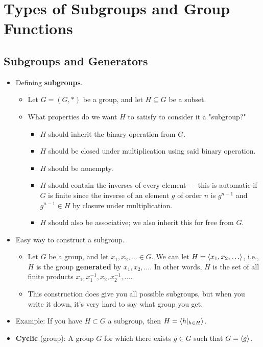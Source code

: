 \documentclass[../notes.tex]{subfiles}
\begin{document}
\chapter{Types of Subgroups and Group Functions}
\section{Subgroups and Generators}
\begin{itemize}
    \item {}Defining \textbf{subgroups}.
    \begin{itemize}
        \item Let $G=(G,*)$ be a group, and let $H\subseteq G$ be a subset.
        \item What properties do we want $H$ to satisfy to consider it a "subgroup?"
        \begin{itemize}
            \item $H$ should inherit the binary operation from $G$.
            \item $H$ should be closed under multiplication using said binary operation.
            \item $H$ should be nonempty.
            \item $H$ should contain the inverses of every element --- this is automatic if $G$ is finite since the inverse of an element $g$ of order $n$ is $g^{n-1}$ and $g^{n-1}\in H$ by closure under multiplication.
            \item $H$ should also be associative; we also inherit this for free from $G$.
        \end{itemize}
    \end{itemize}
    \item Easy way to construct a subgroup.
    \begin{itemize}
        \item Let $G$ be a group, and let $x_1,x_2,\dots\in G$. We can let $H=\left\langle{x_1,x_2,\dots}\right\rangle$, i.e., $H$ is the group \textbf{generated} by $x_1,x_2,\dots$. In other words, $H$ is the set of all finite products $x_1,x_1^{-1},x_2,x_2^{-1},\dots$.
        \item This construction does give you all possible subgroups, but when you write it down, it's very hard to say what group you get.
    \end{itemize}
    \item Example: If you have $H\subset G$ a subgroup, then $H=\left\langle{h|_{h\in H}}\right\rangle$.
    \item \textbf{Cyclic} (group): A group $G$ for which there exists $g\in G$ such that $G=\left\langle{g}\right\rangle$.

\end{itemize}
\end{document}
